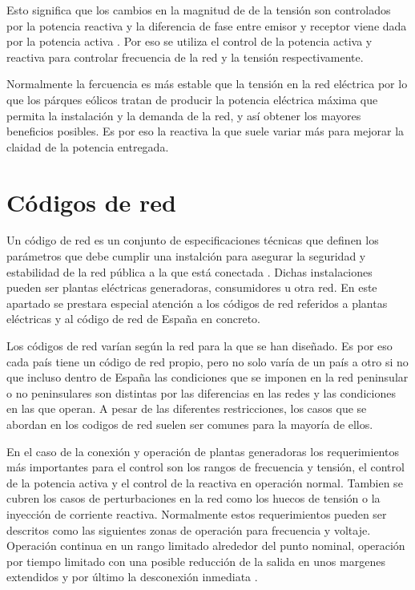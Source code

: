 \documentclass{book}
\begin{document}
Esto significa que los cambios en la magnitud de de la tensi\'on son controlados por la potencia reactiva y la  diferencia de fase entre emisor y receptor viene dada por la potencia activa \cite{WFgridcode}. Por eso se utiliza el control de la potencia activa y reactiva para controlar frecuencia de la red y la tensi\'on respectivamente. \par

Normalmente la fercuencia es m\'as estable que la tensi\'on en la red el\'ectrica por lo que los p\'arques e\'olicos tratan de producir la potencia el\'ectrica m\'axima que permita la instalaci\'on y la demanda de la red, y as\'i obtener los mayores beneficios posibles. Es por eso la reactiva la que suele variar m\'as para mejorar la claidad de la potencia entregada. 


	\section{C\'odigos de red}

Un c\'odigo de red es un conjunto de especificaciones t\'ecnicas que definen los par\'ametros que debe cumplir una instalci\'on para asegurar la seguridad y estabilidad de la red p\'ublica a la que est\'a conectada  \cite{UKgridCode}. Dichas instalaciones pueden ser plantas el\'ectricas generadoras, consumidores u otra red. En este apartado se prestara especial atenci\'on a los c\'odigos de red referidos a plantas el\'ectricas y al c\'odigo de red de España en concreto. \par

Los c\'odigos de red var\'ian seg\'un la red para la que se han diseñado. Es por eso cada pa\'is tiene un c\'odigo de red propio, pero no solo var\'ia de un pa\'is a otro si no que incluso dentro de España las condiciones que se imponen en la red peninsular o no peninsulares son distintas por las diferencias en las redes y las condiciones en las que operan. A pesar de las diferentes restricciones, los casos que se abordan en los codigos de red suelen ser comunes para la mayor\'ia de ellos.  \par

En el caso de la conexi\'on y operaci\'on de plantas generadoras los requerimientos m\'as importantes para el control son los rangos de frecuencia y tensi\'on, el control de la potencia activa y el control de la reactiva en operaci\'on normal. Tambien se cubren los casos de perturbaciones en la red como los huecos de tensi\'on o la inyecci\'on de corriente reactiva. Normalmente estos requerimientos pueden ser descritos como las siguientes zonas de operaci\'on para frecuencia y voltaje. Operaci\'on continua en un rango limitado alrededor del punto nominal, operaci\'on por tiempo limitado con una posible reducci\'on de la salida en unos margenes extendidos y por \'ultimo la desconexi\'on inmediata \cite{GridCodeDeepAnalisys}.\par
\end{document}
